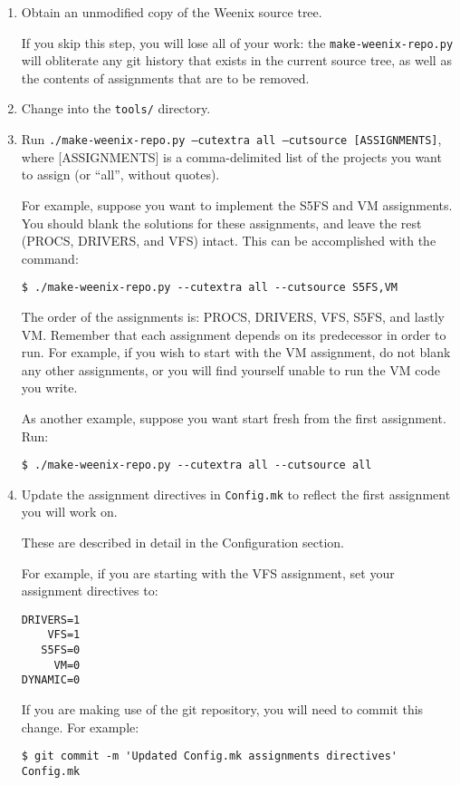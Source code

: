 \begin{enumerate}

\item Obtain an unmodified copy of the Weenix source tree.

If you skip this step, you will lose all of your work: the \texttt{make-weenix-repo.py} will obliterate any git history that exists in the current source tree, as well as the contents of assignments that are to be removed.

\item Change into the \texttt{tools/} directory.

\item Run \texttt{./make-weenix-repo.py --cutextra all --cutsource [ASSIGNMENTS]}, where [ASSIGNMENTS] is a comma-delimited list of the projects you want to assign (or ``all'', without quotes).

For example, suppose you want to implement the S5FS and VM assignments.  You should blank the solutions for these assignments, and leave the rest (PROCS, DRIVERS, and VFS) intact.  This can be accomplished with the command:

\begin{verbatim}
$ ./make-weenix-repo.py --cutextra all --cutsource S5FS,VM\end{verbatim}

The order of the assignments is: PROCS, DRIVERS, VFS, S5FS, and lastly VM.  Remember that each assignment depends on its predecessor in order to run.  For example, if you wish to start with the VM assignment, do not blank any other assignments, or you will find yourself unable to run the VM code you write.

As another example, suppose you want start fresh from the first assignment.  Run:

\begin{verbatim}
$ ./make-weenix-repo.py --cutextra all --cutsource all\end{verbatim}

\item Update the assignment directives in \texttt{Config.mk} to reflect the first assignment you will work on.

These are described in detail in the Configuration section.

For example, if you are starting with the VFS assignment, set your assignment directives to:

\begin{verbatim}
DRIVERS=1
    VFS=1
   S5FS=0
     VM=0
DYNAMIC=0\end{verbatim}

If you are making use of the git repository, you will need to commit this change.  For example:

\begin{verbatim}
$ git commit -m 'Updated Config.mk assignments directives' Config.mk\end{verbatim}

\end{enumerate}

